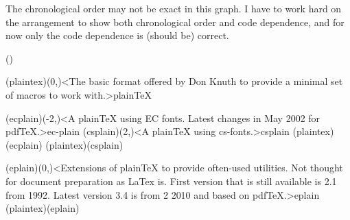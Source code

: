 \vfill

{\flushleft The chronological order may not be exact in this graph. I have to work hard on the arrangement to show both chronological order and code dependence, and for now only the code dependence is (should be) correct.

} 

\clearpage

\tograph(){
	\tonode(plaintex)(0,\layer)<The basic format offered by Don Knuth to provide a minimal set of macros to work with.>{plain\TeX}
\steplayer[-2]

	\tonode[\experimental](ecplain)(-2,\layer)<A plainTeX using EC fonts. Latest changes in May 2002 for pdfTeX.>{ec-plain}
	\tonode[\experimental](csplain)(2,\layer)<A plainTeX using cs-fonts.>{csplain}
	\todraw(plaintex)(ecplain)
	\todraw(plaintex)(csplain)

\steplayer[-2]
	\tonode[\experimental](eplain)(0,\layer)<Extensions of plainTeX to provide often-used utilities. Not thought for document preparation as LaTex is. First version that is still available is 2.1 from 1992. Latest version 3.4 is from 2 2010 and based on pdfTeX.>{eplain}
	\todraw(plaintex)(eplain)
}
\clearpage

